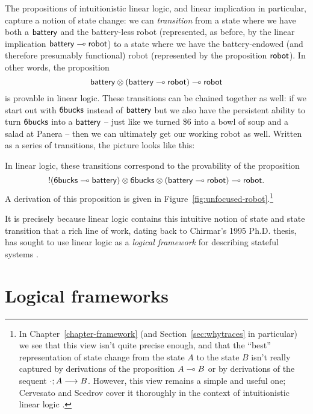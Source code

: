 The propositions of intuitionistic linear logic, and linear implication
in particular, capture a notion of state change: we can {\it
  transition} from a state where we have both a ${\sf battery}$ and
the battery-less robot (represented, as before, by the linear
implication ${\sf battery} \multimap {\sf robot}$) to a state where we
have the battery-endowed (and therefore presumably functional) robot
(represented by the proposition ${\sf robot}$). In other words, the
proposition
%
\[{\sf battery} \otimes ({\sf battery} \multimap {\sf robot}) \multimap
{\sf robot}\] 
%
is provable in linear logic. These transitions can be chained
together as well: if we start out with ${\sf
  6bucks}$ instead of ${\sf battery}$ but we also have the
persistent ability to turn ${\sf 6bucks}$ into a ${\sf battery}$ --
just like we turned \$6 into a bowl of soup and a salad at Panera --
then we can ultimately get our working robot as well.
Written as a series of transitions, the picture looks like this:

In linear logic, these transitions correspond to the provability
of the proposition
\[{!}({\sf 6bucks} \multimap {\sf battery}) \otimes {\sf 6bucks} \otimes
({\sf battery} \multimap {\sf robot}) \multimap {\sf robot}.\] A derivation
of this proposition is given in
Figure~\ref{fig:unfocused-robot}.\footnote{In
  Chapter~\ref{chapter-framework} (and Section~\ref{sec:whytraces} in
  particular) we see that this view isn't quite precise enough, and
  that the ``best'' representation of state change from the state
  $A$ to the state $B$ isn't really captured by derivations of the
  proposition $A \multimap B$ or by derivations of the sequent
  ${\cdot};{A} \longrightarrow {B} \mathstrut$.  However, this view remains a simple and useful
  one; Cervesato and Scedrov cover it thoroughly in the context of
  intuitionistic linear logic \cite{cervesato09relating}.}



It is precisely because linear logic contains this intuitive notion of
state and state transition that a rich line of work, dating back to
Chirmar's 1995 Ph.D. thesis, has sought to use linear logic as a {\it
  logical framework} for describing stateful systems
\cite{chirimar95proof,cervesato02linear,
  cervesato02concurrent,pfenning04substructural,miller09formalizing,
  pfenning09substructural,cervesato09relating}.  

\section{Logical frameworks}
\label{sec:linlogicalframeworks}

